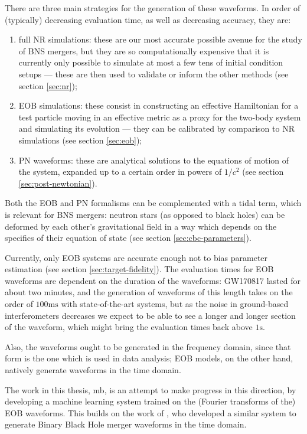\documentclass[main.tex]{subfiles}
\begin{document}
There are three main strategies for the generation of these waveforms. In order of (typically) decreasing evaluation time, as well as decreasing accuracy, they are:
\begin{enumerate}
    \item full \ac{NR} simulations: these are our most accurate possible avenue for the study of \ac{BNS} mergers, but they are so computationally expensive that it is currently only possible to simulate at most a few tens of initial condition setups --- these are then used to validate or inform the other methods (see section \ref{sec:nr});
    \item \ac{EOB} simulations: these consist in constructing an effective Hamiltonian for a test particle moving in an effective metric as a proxy for the two-body system and simulating its evolution --- they can be calibrated by comparison to \ac{NR} simulations (see section \ref{sec:eob});
    \item \ac{PN} waveforms: these are analytical solutions to the equations of motion of the system, expanded up to a certain order in powers of $1/c^2$ (see section \ref{sec:post-newtonian}).
\end{enumerate}

Both the \ac{EOB} and \ac{PN} formalisms can be complemented with a tidal term, which is relevant for \ac{BNS} mergers: neutron stars (as opposed to black holes) can be deformed by each other's gravitational field in a way which depends on the specifics of their equation of state (see section \ref{sec:cbc-parameters}). 

Currently, only \ac{EOB} systems are accurate enough not to bias parameter estimation (see section \ref{sec:target-fidelity}).
The evaluation times for \ac{EOB} waveforms are dependent on the duration of the waveforms: GW170817 lasted for about two minutes, and the generation of waveforms of this length takes on the order of $100\text{ms}$ with state-of-the-art systems, but as the noise in ground-based interferometers decreases we expect to be able to see a longer and longer section of the waveform, which might bring the evaluation times back above $1\text{s}$. 

Also, the waveforms ought to be generated in the frequency domain, since that form is the one which is used in data analysis;
EOB models, on the other hand, natively generate waveforms in the time domain. 

The work in this thesis, \ac{mb}, is an attempt to make progress in this direction, by developing a machine learning system trained on the (Fourier transforms of the) \ac{EOB} waveforms. 
This builds on the work of \textcite{schmidtMachineLearningGravitational2020}, who developed a similar system to generate Binary Black Hole merger waveforms in the time domain.
\end{document}
